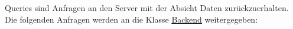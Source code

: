 Queries sind Anfragen an den Server mit der Absicht Daten zurückzuerhalten.
Die folgenden Anfragen werden an die Klasse \hyperref[AP_Backend]{Backend} weitergegeben: